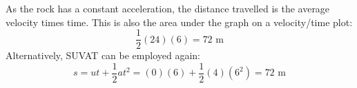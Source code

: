 \begin{problem}[O1979PIIQ3a]
{\begin{enumerate}
As the rock has a constant acceleration, the distance travelled is the average velocity times time. This is also the area under the graph on a velocity/time plot:
	\begin{equation*}\frac{1}{2}(24)(6) = 72 \textrm{ m} \end{equation*}
Alternatively, SUVAT can be employed again:
	\begin{equation*}s = ut + \frac{1}{2}at^{2} = (0)(6) + \frac{1}{2}(4)(6^{2}) = 72 \textrm{ m} \end{equation*}

\end{enumerate}
}
\end{problem}